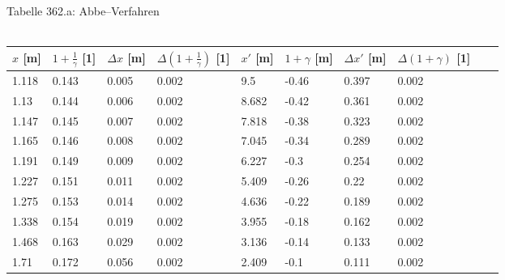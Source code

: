 \documentclass[a4paper,12pt]{article}
\begin{document}
\noindent Tabelle 362.a: Abbe--Verfahren\\\\
\begin{tabular}{ llllllllll }
	 $x$ [m] & $1+\frac{1}{\gamma}$ [1] & $\Delta x$ [m] & $\Delta \left(1+\frac{1}{\gamma}\right)$ [1] & $x'$ [m] & $1+\gamma$ [m] & $\Delta x'$ [m] & $\Delta \left(1+\gamma\right)$ [1] \\
	\hline
	 1.118 & 0.143 & 0.005 & 0.002 & 9.5 & -0.46 & 0.397 & 0.002 \\
	 1.13 & 0.144 & 0.006 & 0.002 & 8.682 & -0.42 & 0.361 & 0.002 \\
	 1.147 & 0.145 & 0.007 & 0.002 & 7.818 & -0.38 & 0.323 & 0.002 \\
	 1.165 & 0.146 & 0.008 & 0.002 & 7.045 & -0.34 & 0.289 & 0.002 \\
	 1.191 & 0.149 & 0.009 & 0.002 & 6.227 & -0.3 & 0.254 & 0.002 \\
	 1.227 & 0.151 & 0.011 & 0.002 & 5.409 & -0.26 & 0.22 & 0.002 \\
	 1.275 & 0.153 & 0.014 & 0.002 & 4.636 & -0.22 & 0.189 & 0.002 \\
	 1.338 & 0.154 & 0.019 & 0.002 & 3.955 & -0.18 & 0.162 & 0.002 \\
	 1.468 & 0.163 & 0.029 & 0.002 & 3.136 & -0.14 & 0.133 & 0.002 \\
	 1.71 & 0.172 & 0.056 & 0.002 & 2.409 & -0.1 & 0.111 & 0.002 \\
\end{tabular}
\end{document}
